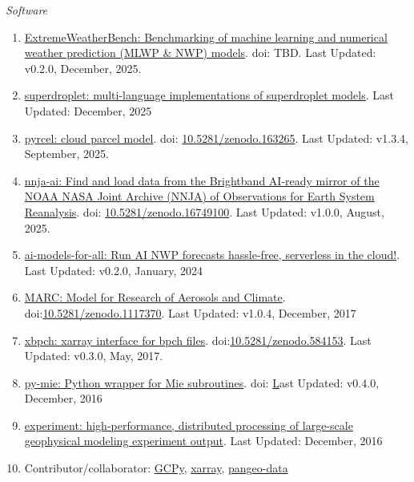 \documentclass[11pt,letterpaper]{article}
\begin{document}
\bigskip
\emph{Software}
\medskip
\begin{enumerate}[itemindent=-10pt]

\item \href{https://github.com/brightbandtech/ExtremeWeatherBench}{ExtremeWeatherBench: Benchmarking of machine learning and numerical weather prediction (MLWP \& NWP) models}. doi: TBD. Last Updated: v0.2.0, December, 2025.

\item \href{https://github.com/darothen/superdroplet}{superdroplet: multi-language implementations of superdroplet models}. Last Updated: December, 2025 

\item \href{https://github.com/darothen/pyrcel}{pyrcel: cloud parcel model}. doi: \href{https://doi.org/10.5281/zenodo.163265}{10.5281/zenodo.163265}. Last Updated: v1.3.4, September, 2025.

\item \href{https://github.com/brightbandtech/nnja-ai}{nnja-ai: Find and load data from the Brightband AI-ready mirror of the NOAA NASA Joint Archive (NNJA) of Observations for Earth System Reanalysis}. doi: \href{https://doi.org/10.5281/zenodo.16749100}{10.5281/zenodo.16749100}. Last Updated: v1.0.0, August, 2025.

\item \href{https://github.com/darothen/ai-models-for-all}{ai-models-for-all: Run AI NWP forecasts hassle-free, serverless in the cloud!}. Last Updated: v0.2.0, January, 2024

\item \href{https://github.mit.edu/marc/marc_cesm}{MARC: Model for Research of Aerosols and Climate}. doi:\href{https://doi.org/10.5281/zenodo.1117370}{10.5281/zenodo.1117370}. Last Updated: v1.0.4, December, 2017

\item \href{https://github.com/darothen/xbpch}{xbpch: xarray interface for bpch files}. doi:\href{https://doi.org/10.5281/zenodo.584153}{10.5281/zenodo.584153}. Last Updated: v0.3.0, May, 2017.

\item \href{https://github.com/darothen/py-mie}{py-mie: Python wrapper for Mie subroutines}. doi: \href{http://doi.org/10.5281/zenodo.192510} Last Updated: v0.4.0, December, 2016

\item \href{https://github.com/darothen/experiment}{experiment: high-performance, distributed processing of large-scale geophysical modeling experiment output}. Last Updated: December, 2016

\item Contributor/collaborator: \href{https://bitbucket.org/gcst/gcpy/}{GCPy}, \href{https://github.com/pydata/xarray}{xarray}, \href{https://github.com/pangeo-data/pangeo}{pangeo-data}

\end{enumerate}
\end{document}
